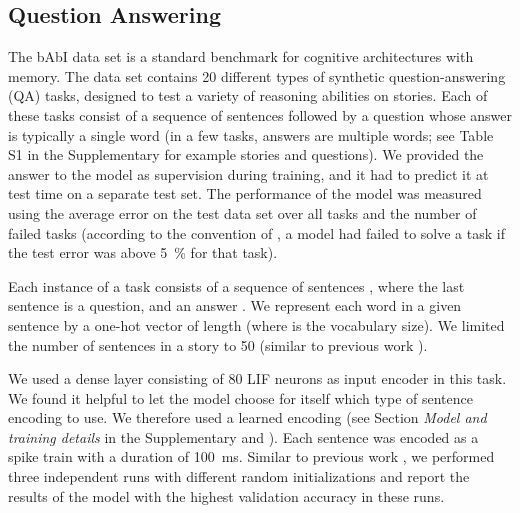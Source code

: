 \documentclass{article}
\begin{document}
\subsection{Question Answering}
\label{sec:results-babi}
The bAbI data set \cite{weston2015towards} is a standard benchmark for cognitive architectures with memory. The data set contains \num{20} different types of synthetic question-answering (QA) tasks, designed to test a variety of reasoning abilities on stories. Each of these tasks consist of a sequence of sentences followed by a question whose answer is typically a single word (in a few tasks, answers are multiple words; see Table S1 in the Supplementary for example stories and questions). We provided the answer to the model as supervision during training, and it had to predict it at test time on a separate test set. The performance of the model was measured using the average error on the test data set over all tasks and the number of failed tasks (according to the convention of \cite{weston2015towards}, a model had failed to solve a task if the test error was above \SI{5}{\percent} for that task).

Each instance of a task consists of a sequence of  sentences , where the last sentence is a question, and an answer . We represent each word  in a given sentence  by a one-hot vector  of length  (where  is the vocabulary size). We limited the number of sentences in a story to \num{50} (similar to previous work \cite{sukhbaatar2015end,henaff2017tracking}).

We used a dense layer consisting of \num{80} \gls{LIF} neurons as input encoder in this task. We found it helpful to let the model choose for itself which type of sentence encoding to use. We therefore used a learned encoding (see Section \emph{Model and training details} in the Supplementary and \cite{henaff2017tracking}). Each sentence was encoded as a spike train with a duration of \SI{100}{ms}. Similar to previous work \cite{sukhbaatar2015end,henaff2017tracking}, we performed three independent runs with different random initializations and report the results of the model with the highest validation accuracy in these runs.
\end{document}
